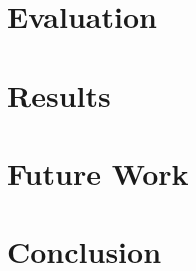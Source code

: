 \documentclass[conference]{IEEEtran}
\begin{document}
\section{Evaluation}

\section{Results}

\section{Future Work}

\section{Conclusion}





\end{document}

